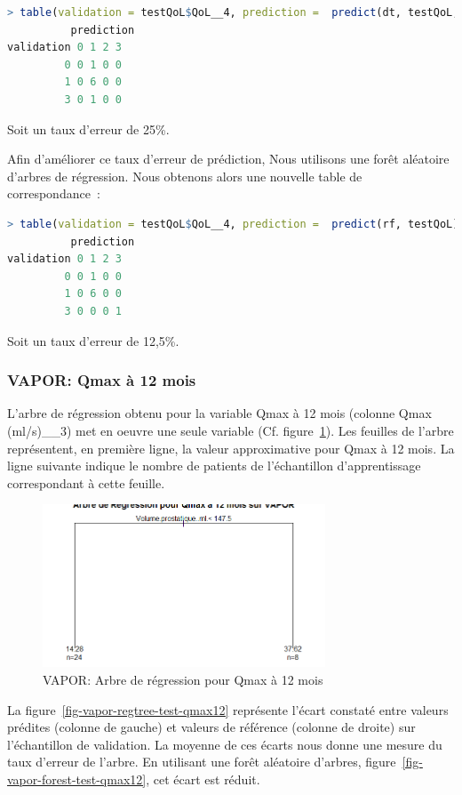 \begin{lstlisting}[language=R]
> table(validation = testQoL$QoL__4, prediction =  predict(dt, testQoL, type="class"))
          prediction
validation 0 1 2 3
         0 0 1 0 0
         1 0 6 0 0
         3 0 1 0 0
\end{lstlisting}
Soit un taux d'erreur de 25\%.

Afin d'améliorer ce taux d'erreur de prédiction, Nous utilisons une forêt aléatoire d'arbres de régression. Nous obtenons alors une nouvelle table de correspondance~:

\begin{lstlisting}[language=R]
> table(validation = testQoL$QoL__4, prediction =  predict(rf, testQoL))
          prediction
validation 0 1 2 3
         0 0 1 0 0
         1 0 6 0 0
         3 0 0 0 1
\end{lstlisting}
Soit un taux d'erreur de 12,5\%.


\subsubsection{VAPOR: Qmax à 12 mois}

L'arbre de régression obtenu pour la variable Qmax à 12 mois (colonne Qmax (ml/s)\_\_3) met en oeuvre une seule variable (Cf. figure~\ref{fig-vapor-regtree-qmax12}). Les feuilles de l'arbre représentent, en première ligne, la valeur approximative pour Qmax à 12 mois. La ligne suivante indique le nombre de patients de l'échantillon d'apprentissage correspondant à cette feuille. 

\begin{figure}[H]
\centering
\includegraphics[width=0.75\textwidth]{../Fig/VAPOR/vapor-regtree-qmax12.png}
\caption{VAPOR: Arbre de régression pour Qmax à 12 mois}
\label{fig-vapor-regtree-qmax12}
\end{figure}

La figure~\ref{fig-vapor-regtree-test-qmax12} représente l'écart constaté entre valeurs prédites (colonne de gauche) et valeurs de référence (colonne de droite) sur l'échantillon de validation. La moyenne de ces écarts nous donne une mesure du taux d'erreur de l'arbre. En utilisant une forêt aléatoire d'arbres, figure~\ref{fig-vapor-forest-test-qmax12}, cet écart est réduit.

